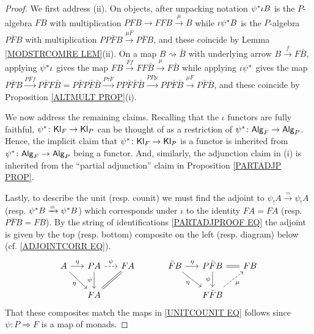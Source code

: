 \documentclass[a4paper,10pt
,draft
]{article}%
\numberwithin{equation}{section}
\numberwithin{figure}{section}
\theoremstyle{definition} %
\newcommand{\Alg}{\mathsf{Alg}}
\newcommand{\Kl}{\mathsf{Kl}}
\newcommand{\1}{\ensuremath{\mathbbm 1}}%
\begin{document}
\begin{proof}
We first address (ii).
On objects,
after unpacking notation
$\psi^{\**} \iota B$
is the $P$-algebra
$F B$ with multiplication
$PFB \rightarrow FFB \xrightarrow{\mu} B$
while 
$ \iota \psi^{\**} B$
is the $P$-algebra
$P \bar{F} B $
with multiplication
$P P \bar{F} B \xrightarrow{\mu \bar{F}} P \bar{F} B$,
and these coincide by Lemma \ref{MODSTRCOMRE LEM}(ii).
On a map
$B \rightsquigarrow \bar{B}$
with underlying arrow $B \xrightarrow{f} F \bar{B}$,
applying $\psi^{\**} \iota$
gives the map
$F B \xrightarrow{F f} FF\bar{B} \xrightarrow{\mu} F \bar{B}$
while applying $\iota \psi^{\**}$
gives the map
$P \bar{F} B \xrightarrow{P \bar{F} f} 
P \bar{F} F \bar{B} = P \bar{F} P \bar{F} \bar{B}
\xrightarrow{P \tau \bar{F}}
P P \bar{F} \bar{F} \bar{B}
\xrightarrow{PP \mu}
P P \bar{F} \bar{B} 
\xrightarrow{\mu \bar{F}} P\bar{F} \bar{B}$,
and these coincide by 
Proposition \ref{ALTMULT PROP}(i).


We now address the remaining claims. 
Recalling that the $\iota$ functors are fully faithful,
$\psi^{\**} \colon \Kl_F \to \Kl_P$
can be thought of as a restriction of
$\psi^{\**} \colon \Alg_F \to \Alg_P$. 
Hence, the implicit claim that $\psi^{\**} \colon \Kl_F \to \Kl_P$
is a functor is inherited from 
$\psi^{\**} \colon \Alg_F \to \Alg_P$ being a functor.
And, similarly, the adjunction claim in (i)
is inherited from the ``partial adjunction'' claim in 
Proposition \ref{PARTADJP PROP}.


Lastly, to describe the unit 
(resp. counit)
we must find the adjoint
to 
$\psi_! A \xrightarrow{=} \psi_! A$
(resp. $\psi^{\**} B \xrightarrow{=} \psi^{\**} B$)
which corresponds under $\iota$ to the identity
$FA = FA$
(resp. $P\bar{F} B = FB$).
By the string of identifications 
\eqref{PARTADJPROOF EQ}
the adjoint is given 
by the top (resp. bottom) composite on the left
(resp. diagram) below
(cf. \eqref{ADJOINTCORR EQ}).
\begin{equation}
\begin{tikzcd}[column sep = 1.55em]
	A \ar{r}{\eta} \ar{rd}[swap]{\eta}
&
	P A \ar[dashed]{r}{\psi} \ar{d}[swap]{\psi}
&
	FA
&&%
	\bar{F} B \ar{r}{\eta} \ar{rd}[swap]{\eta}
&
	P \bar{F} B \ar[equal]{r} \ar{d}[swap]{\psi}
&
	F B 
\\
&
	FA \ar[equal]{ru}
&
&&%
&
	F\bar{F} B \ar[dashed]{ru}[swap]{\mu}
&
\end{tikzcd}
\end{equation}
That these composites match the maps in
\eqref{UNITCOUNIT EQ}
follows since $\psi\colon P \Rightarrow F$ is a map of monads. 
\end{proof}
\end{document}
